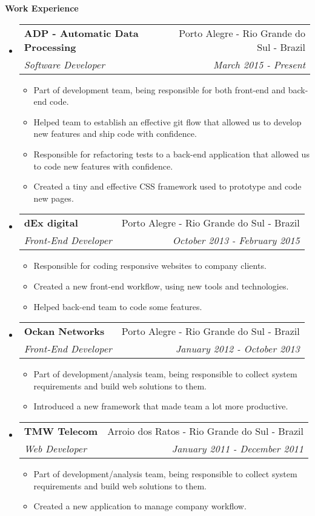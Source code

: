 \documentclass[letterpaper,11pt]{article}
\makeatletter
\newcommand{\resitem}[1]{\item #1 \vspace{-2pt}}
\newcommand{\resheading}[1]{{\large \colorbox{mygrey}{\begin{minipage}{\textwidth}{\textbf{#1 \vphantom{p\^{E}}}}\end{minipage}}}}
\newcommand{\ressubheading}[4]{
\begin{tabular*}{7.0in}{l@{\extracolsep{\fill}}r}
    \textbf{#1} & #2 \\
    \textit{#3} & \textit{#4} \\
\end{tabular*}\vspace{-6pt}}
\makeatother
\begin{document}
    \resheading{Work Experience}
    \begin{itemize}
        \item
            \ressubheading
                {ADP - Automatic Data Processing}
                {Porto Alegre - Rio Grande do Sul - Brazil}
                {Software Developer}
                {March 2015 - Present}
            \begin{itemize}
                \resitem{Part of development team, being responsible for both front-end and back-end code.}
                \resitem{Helped team to establish an effective git flow that allowed us to develop new features and ship code with confidence.}
                \resitem{Responsible for refactoring tests to a back-end application that allowed us to code new features with confidence.}
                \resitem{Created a tiny and effective CSS framework used to prototype and code new pages.}
            \end{itemize}

        \item
            \ressubheading
                {dEx digital}
                {Porto Alegre - Rio Grande do Sul - Brazil}
                {Front-End Developer}
                {October 2013 - February 2015}
            \begin{itemize}
                \resitem{Responsible for coding responsive websites to company clients.}
                \resitem{Created a new front-end workflow, using new tools and technologies.}
                \resitem{Helped back-end team to code some features.}
            \end{itemize}

        \item
            \ressubheading
                {Ockan Networks}
                {Porto Alegre - Rio Grande do Sul - Brazil}
                {Front-End Developer}
                {January 2012 - October 2013}
            \begin{itemize}
                \resitem{Part of development/analysis team, being responsible to collect system requirements and build web solutions to them.}
                \resitem{Introduced a new framework that made team a lot more productive.}
            \end{itemize}

        \item
            \ressubheading
                {TMW Telecom}
                {Arroio dos Ratos - Rio Grande do Sul - Brazil}
                {Web Developer}
                {January 2011 - December 2011}
            \begin{itemize}
                \resitem{Part of development/analysis team, being responsible to collect system requirements and build web solutions to them.}
                \resitem{Created a new application to manage company workflow.}
            \end{itemize}
    \end{itemize}
\end{document}
